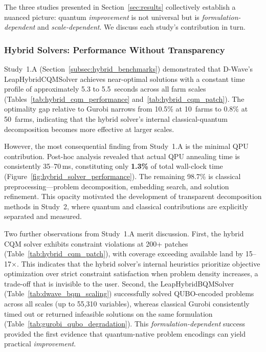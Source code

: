 The three studies presented in Section~\ref{sec:results} collectively establish a nuanced picture: quantum \textit{improvement} is not universal but is \textit{formulation-dependent} and \textit{scale-dependent}. We discuss each study's contribution in turn.

\subsubsection{Hybrid Solvers: Performance Without Transparency}

Study~1.A (Section~\ref{subsec:hybrid_benchmarks}) demonstrated that D-Wave's LeapHybridCQMSolver achieves near-optimal solutions with a constant time profile of approximately 5.3 to 5.5~seconds across all farm scales (Tables~\ref{tab:hybrid_cqm_performance} and~\ref{tab:hybrid_cqm_patch}). The optimality gap relative to Gurobi narrows from 10.5\% at 10~farms to 0.8\% at 50~farms, indicating that the hybrid solver's internal classical-quantum decomposition becomes more effective at larger scales.

However, the most consequential finding from Study~1.A is the minimal QPU contribution. Post-hoc analysis revealed that actual QPU annealing time is consistently 35--70\,ms, constituting only \textbf{1.3\%} of total wall-clock time (Figure~\ref{fig:hybrid_solver_performance}). The remaining 98.7\% is classical preprocessing---problem decomposition, embedding search, and solution refinement. This opacity motivated the development of transparent decomposition methods in Study~2, where quantum and classical contributions are explicitly separated and measured.

Two further observations from Study~1.A merit discussion. First, the hybrid CQM solver exhibits constraint violations at 200+ patches (Table~\ref{tab:hybrid_cqm_patch}), with coverage exceeding available land by 15--17$\times$. This indicates that the hybrid solver's internal heuristics prioritize objective optimization over strict constraint satisfaction when problem density increases, a trade-off that is invisible to the user. Second, the LeapHybridBQMSolver (Table~\ref{tab:dwave_bqm_scaling}) successfully solved QUBO-encoded problems across all scales (up to 55,310 variables), whereas classical Gurobi consistently timed out or returned infeasible solutions on the same formulation (Table~\ref{tab:gurobi_qubo_degradation}). This \textit{formulation-dependent} success provided the first evidence that quantum-native problem encodings can yield practical \textit{improvement}.

